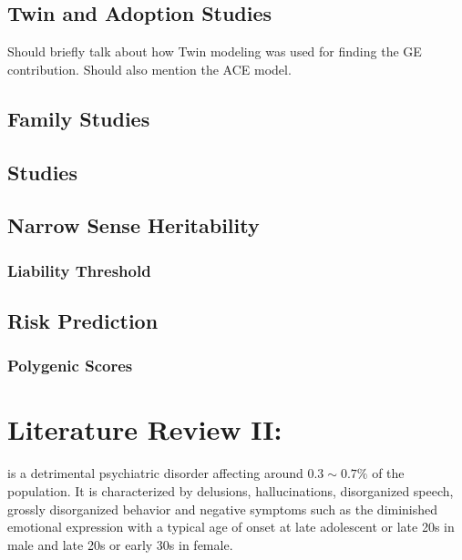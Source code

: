 \documentclass{book}
\begin{document}
	\section{Twin and Adoption Studies}
	Should briefly talk about how Twin modeling was used for finding the GE contribution.
	Should also mention the ACE model.
	\section{Family Studies}
	
	\section{}
	\section{ Studies}
	\section{Narrow Sense Heritability}
	\subsection{}
	\subsection{Liability Threshold}
	
	\section{Risk Prediction}
	\subsection{Polygenic Scores}
	
	
	
	\chapter{Literature Review II: }
	 is a detrimental psychiatric disorder affecting around $0.3\sim0.7\%$ of the population\citep{AmericanPsychiatricAssociation2013}.
	It is characterized by delusions, hallucinations, disorganized speech, grossly disorganized behavior and negative symptoms such as the diminished emotional expression\citep{AmericanPsychiatricAssociation2013} with a typical age of onset at late adolescent or late 20s in male and late 20s or early 30s in female\citep{Schultz2007}.
	
\end{document}
